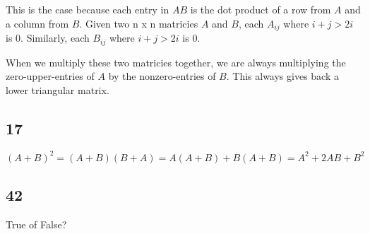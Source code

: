 \documentclass[12pt,letterpaper]{article}
\begin{document}
      This is the case because each entry in $AB$ is the dot product of a row from $A$ and a column from $B$.
      Given two n x n matricies $A$ and $B$, each $A_{ij}$ where $i+j > 2i$ is $0$.
      Similarly, each $B_{ij}$ where $i+j > 2i$ is $0$.

      When we multiply these two matricies together, we are always multiplying the zero-upper-entries of $A$ by the nonzero-entries of $B$.
      This always gives back a lower triangular matrix.
    \subsection*{17}
      \[
        (A+B)^2 = (A+B)(B+A) = A(A+B) + B(A+B) = A^2 + 2AB + B^2
      \]
    \subsection*{42}
      True of False?
\end{document}
